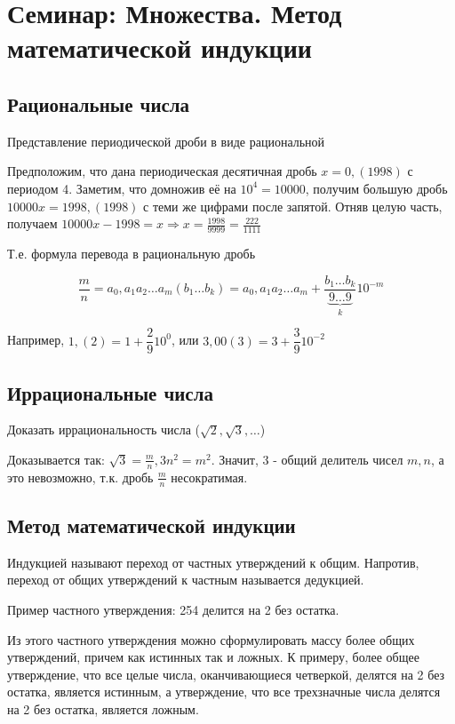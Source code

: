 \section{Семинар: Множества. Метод математической индукции}

\subsection{Рациональные числа}

Представление периодической дроби в виде рациональной

Предположим, что дана периодическая десятичная дробь $x=0,(1998)$ с периодом 4. Заметим, что домножив её на $10^4 = 10000$, получим большую дробь $10000x=1998,(1998)$ с теми же цифрами после запятой. Отняв целую часть, получаем $10000x-1998=x \Rightarrow x=\frac{1998}{9999}=\frac{222}{1111}$

Т.е.  формула перевода в рациональную дробь

$$
\dfrac{m}{n} = a_0,a_1 a_2 \ldots a_m (b_1 \ldots b_k) 
= a_0,a_1 a_2 \ldots a_m + \dfrac{b_1 \ldots b_k}{ \underbrace{9 \ldots 9}_{k} }10^{-m}
$$

Например, $1,(2) = 1 + \dfrac{2}{9} 10^0$, или $3,00(3) = 3 + \dfrac{3}{9}10^{-2}$

\subsection{Иррациональные числа}

Доказать иррациональность числа ($ \sqrt{2}, \sqrt{3}, \ldots $)

Доказывается так: $\sqrt{3} = \frac{m}{n}, 3n^2 = m^2$. Значит, 3 - общий делитель чисел $m, n $, а это невозможно, т.к. дробь $ \frac{m}{n} $ несократимая.

\subsection{Метод математической индукции}

Индукцией называют переход от частных утверждений к общим. Напротив, переход от общих утверждений к частным называется дедукцией.

Пример частного утверждения: 254 делится на 2 без остатка.

Из этого частного утверждения можно сформулировать массу более общих утверждений, причем как истинных так и ложных. К примеру, более общее утверждение, что все целые числа, оканчивающиеся четверкой, делятся на 2 без остатка, является истинным, а утверждение, что все трехзначные числа делятся на 2 без остатка, является ложным.

